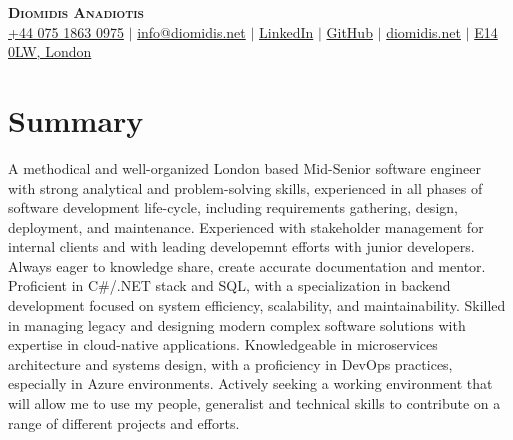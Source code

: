 \documentclass[letterpaper,11pt]{article}
\renewcommand{\headrulewidth}{0pt}
\renewcommand{\footrulewidth}{0pt}
\begin{document}

\begin{adjustwidth}{-0.2in}{-0.2in}
  \begin{center}
      \textbf{\LARGE \scshape Diomidis Anadiotis} \\ \vspace{3pt}
      \small
      \faMobile \hspace{.5pt} \href{tel:447518630975}{+44 075 1863 0975}
      $|$
      \faAt \hspace{.5pt} \href{mailto:info@diomidis.net}{info@diomidis.net}
      $|$
      \faLinkedinSquare \hspace{.5pt} \href{https://www.linkedin.com/in/diomidis-anadiotis/}{LinkedIn}
      $|$
      \faGithub \hspace{.5pt} \href{https://github.com/diomidis}{GitHub}
      $|$
      \faGlobe \hspace{.5pt} \href{https://diomidis.net}{diomidis.net}
      $|$
      \faMapMarker \hspace{.5pt} \href{}{E14 0LW, London}
  \end{center}
  \end{adjustwidth}
  

\pagestyle{fancy}
\fancyhf{} %
\renewcommand{\headrulewidth}{0pt}
\renewcommand{\footrulewidth}{0pt}

\section{Summary}
\small{
  A methodical and well-organized London based Mid-Senior software engineer with strong analytical and problem-solving skills, experienced in all phases of software development life-cycle, 
  including requirements gathering, design, deployment, and maintenance. Experienced with stakeholder management for internal clients and with leading developemnt efforts with junior developers. Always eager to knowledge share, create accurate documentation and mentor.
  Proficient in C\#/.NET stack and SQL, with a specialization 
  in backend development focused on system efficiency, scalability, and maintainability. Skilled in managing legacy and designing modern complex software solutions with expertise in cloud-native applications.
  Knowledgeable in microservices architecture and systems design, with a proficiency in DevOps practices, especially in Azure environments. Actively seeking a working environment that will allow me to use my people, generalist and technical skills to contribute on a range of different projects and efforts.
} \vspace{-5pt}
\end{document}
